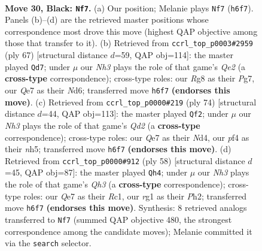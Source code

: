 \documentclass[11pt]{article}
\begin{document}
\clearpage

\begin{figure}[p]\centering
\begin{subfigure}{0.46\textwidth}\centering
\resizebox{\linewidth}{!}{%
\newchessgame
\chessboard[
  setfen={6r1/p1pkq1pp/1p2p2n/2p1Q3/5PP1/2P4P/1P6/2K3R1 b - - 0 30},
  showmover=false,
  pgfstyle=straightmove, color=movearrow, markmove={h6-f7}
]}
\caption{}
\end{subfigure}\hfill
\begin{subfigure}{0.46\textwidth}\centering
\resizebox{\linewidth}{!}{%
\newchessgame
\chessboard[
  setfen={4k3/1p2q1p1/pQpn1p1p/P6P/1P6/4P1P1/5PB1/6K1 b - - 4 34},
  showmover=false,
  pgfstyle=straightmove, color=movearrow, markmove={e7-d7}
]}
\caption{}
\end{subfigure}
\\[4pt]
\begin{subfigure}{0.46\textwidth}\centering
\resizebox{\linewidth}{!}{%
\newchessgame
\chessboard[
  setfen={6k1/pp2rp2/6pp/3p3n/3N3P/P1P2Pq1/1P1Q2P1/3R2K1 w - - 0 38},
  showmover=false,
  pgfstyle=straightmove, color=movearrow, markmove={d2-f2}
]}
\caption{}
\end{subfigure}\hfill
\begin{subfigure}{0.46\textwidth}\centering
\resizebox{\linewidth}{!}{%
\newchessgame
\chessboard[
  setfen={r5k1/5p2/p3p1pP/3pP3/1p2qP2/1P5Q/P1P4P/1KR5 w - - 0 30},
  showmover=false,
  pgfstyle=straightmove, color=movearrow, markmove={h3-h4}
]}
\caption{}
\end{subfigure}
\caption{\textbf{Move 30, Black: \texttt{Nf7}.} (a) Our position; Melanie plays \texttt{Nf7} (\texttt{h6f7}). Panels (b)--(d) are the retrieved master positions whose correspondence most drove this move (highest QAP objective among those that transfer to it). (b) Retrieved from \texttt{ccrl\_top\_p0003\#2959} (ply 67) [structural distance $d$=59, QAP obj=114]: the master played \texttt{Qd7}; under $\mu$ our \emph{Nh3} plays the role of that game's \emph{Qe2} (a \textbf{cross-type} correspondence); cross-type roles: our \emph{R}g8 as their \emph{P}g7, our \emph{Q}e7 as their \emph{N}d6; transferred move \texttt{h6f7} \textbf{(endorses this move)}. (c) Retrieved from \texttt{ccrl\_top\_p0000\#219} (ply 74) [structural distance $d$=44, QAP obj=113]: the master played \texttt{Qf2}; under $\mu$ our \emph{Nh3} plays the role of that game's \emph{Qd2} (a \textbf{cross-type} correspondence); cross-type roles: our \emph{Q}e7 as their \emph{N}d4, our \emph{p}f4 as their \emph{n}h5; transferred move \texttt{h6f7} \textbf{(endorses this move)}. (d) Retrieved from \texttt{ccrl\_top\_p0000\#912} (ply 58) [structural distance $d$=45, QAP obj=87]: the master played \texttt{Qh4}; under $\mu$ our \emph{Nh3} plays the role of that game's \emph{Qh3} (a \textbf{cross-type} correspondence); cross-type roles: our \emph{Q}e7 as their \emph{R}c1, our \emph{r}g1 as their \emph{P}h2; transferred move \texttt{h6f7} \textbf{(endorses this move)}. Synthesis: 8 retrieved analogs transferred to \texttt{Nf7} (summed QAP objective 480, the strongest correspondence among the candidate moves); Melanie committed it via the \texttt{search} selector.}
\label{fig:thought-m59}
\end{figure}
\end{document}
